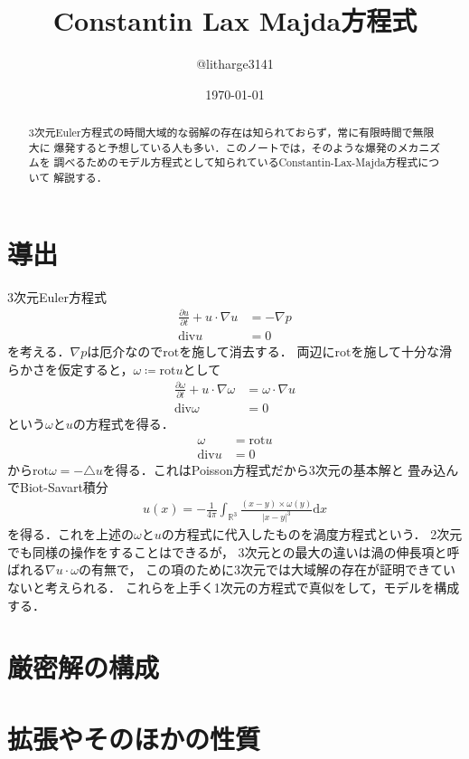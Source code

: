 \documentclass[dvipdfmx,autodetect-engine]{jsarticle}
\theoremstyle{remark}
\theoremstyle{definition}
\newcommand{\R}{\mathbb{R}}
\begin{document}
\title{Constantin Lax Majda方程式}
\author{@litharge3141}
\date{\today}
\maketitle

\begin{abstract}
    3次元Euler方程式の時間大域的な弱解の存在は知られておらず，常に有限時間で無限大に
    爆発すると予想している人も多い．このノートでは，そのような爆発のメカニズムを
    調べるためのモデル方程式として知られているConstantin-Lax-Majda方程式について
    解説する．
\end{abstract}

\section{導出}
3次元Euler方程式
\begin{align*}
   \frac{\partial u}{\partial t} + u \cdot \nabla u &= - \nabla p \\
   \mathrm{div}u &=0
\end{align*}
を考える．$\nabla p$は厄介なので$\mathrm{rot}$を施して消去する．
両辺に$\mathrm{rot}$を施して十分な滑らかさを仮定すると，$\omega \coloneqq \mathrm{rot} u$として
\begin{align*}
    \frac{\partial \omega}{\partial t} + u \cdot \nabla \omega &= \omega \cdot \nabla u \\
    \mathrm{div}\omega &=0
\end{align*}
という$\omega$と$u$の方程式を得る．
\begin{align*}
    \omega &= \mathrm{rot} u \\
    \mathrm{div} u &= 0
\end{align*}
から$\mathrm{rot} \omega = - \triangle u$を得る．これはPoisson方程式だから3次元の基本解と
畳み込んでBiot-Savart積分
\begin{align*}
    u(x) = -\frac{1}{4\pi} \int_{\R^3} \frac{(x-y)\times \omega(y)}{{\lvert x-y \rvert}^3} \mathrm{d}x
\end{align*}
を得る．これを上述の$\omega$と$u$の方程式に代入したものを渦度方程式という．
2次元でも同様の操作をすることはできるが，
3次元との最大の違いは渦の伸長項と呼ばれる$\nabla u \cdot \omega$の有無で，
この項のために3次元では大域解の存在が証明できていないと考えられる．
これらを上手く1次元の方程式で真似をして，モデルを構成する．
\section{厳密解の構成}
\section{拡張やそのほかの性質}
    
\end{document}
